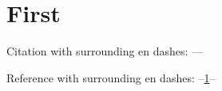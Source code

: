 \documentclass{scrartcl}
\begin{document}
\section{First} \label{sec:first}
Citation with surrounding en dashes: --\cite{test}--

Reference with surrounding en dashes: --\ref{sec:first}--

\end{document}
